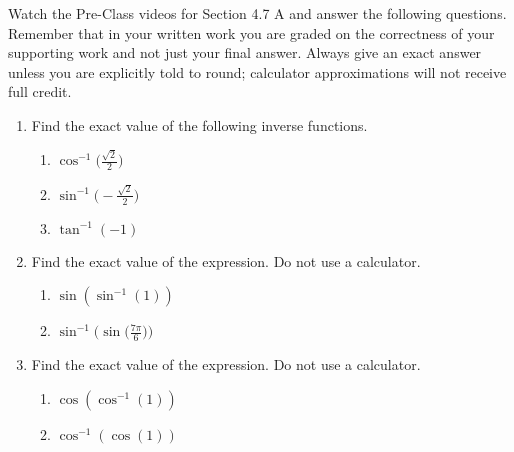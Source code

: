 


\noindent Watch the Pre-Class videos for Section 4.7 A and answer the following questions. Remember that in your written work you are graded on the correctness of your supporting work and not just your final answer. Always give an exact answer unless you are explicitly told to round; calculator approximations will not receive full credit. 


\begin{enumerate}
\item  Find the exact value of the following inverse functions.

\begin{enumerate}
\item $\displaystyle \cos^{-1}\Big(\frac{\sqrt{2}}{2}\Big)$\vfill
\item $\displaystyle \sin^{-1}\Big(-\frac{\sqrt{2}}{2}\Big)$\vfill
\item $\displaystyle \tan^{-1}(-1)$\vfill

\end{enumerate}
\newpage


\item  Find the exact value of the expression.  Do not use a calculator.

\begin{enumerate}
\item $\sin(\sin^{-1}(1))$\vfill
\item $\displaystyle \sin^{-1}\Big(\sin\Big(\frac{7\pi}{6}\Big)\Big)$\vfill
\end{enumerate}

\item  Find the exact value of the expression.  Do not use a calculator.

\begin{enumerate}
\item $\cos(\cos^{-1}(1))$\vfill
\item $\displaystyle \cos^{-1}(\cos(1))$\vfill
\end{enumerate}
\end{enumerate}



